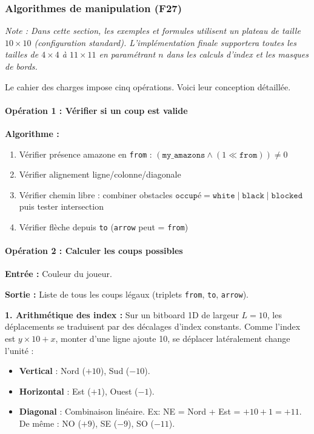 \documentclass[a4paper]{article}
\begin{document}
\subsubsection{Algorithmes de manipulation (F27)}

\noindent\textit{Note : Dans cette section, les exemples et formules utilisent un plateau de taille $10 \times 10$ (configuration standard). L'implémentation finale supportera toutes les tailles de $4 \times 4$ à $11 \times 11$ en paramétrant $n$ dans les calculs d'index et les masques de bords.}

Le cahier des charges impose cinq opérations. Voici leur conception détaillée.

\paragraph{Opération 1 : Vérifier si un coup est valide}

\textbf{Algorithme :}
\begin{enumerate}[noitemsep]
    \item Vérifier présence amazone en \texttt{from} : $(\texttt{my\_amazons} \land (1 \ll \texttt{from})) \neq 0$
    \item Vérifier alignement ligne/colonne/diagonale
    \item Vérifier chemin libre : combiner obstacles $\texttt{occupé} = \texttt{white} \mid \texttt{black} \mid \texttt{blocked}$ puis tester intersection
    \item Vérifier flèche depuis \texttt{to} (\texttt{arrow} peut = \texttt{from})
\end{enumerate}

\paragraph{Opération 2 : Calculer les coups possibles}

\textbf{Entrée :} Couleur du joueur.

\textbf{Sortie :} Liste de tous les coups légaux (triplets \texttt{from}, \texttt{to}, \texttt{arrow}).

\textbf{1. Arithmétique des index :}
Sur un bitboard 1D de largeur $L=10$, les déplacements se traduisent par des décalages d'index constants. Comme l'index est $y \times 10 + x$, monter d'une ligne ajoute 10, se déplacer latéralement change l'unité :
\begin{itemize}[noitemsep]
    \item \textbf{Vertical} : Nord ($+10$), Sud ($-10$).
    \item \textbf{Horizontal} : Est ($+1$), Ouest ($-1$).
    \item \textbf{Diagonal} : Combinaison linéaire. Ex: NE = Nord + Est = $+10 + 1 = +11$. De même : NO ($+9$), SE ($-9$), SO ($-11$).
\end{itemize}
\end{document}
